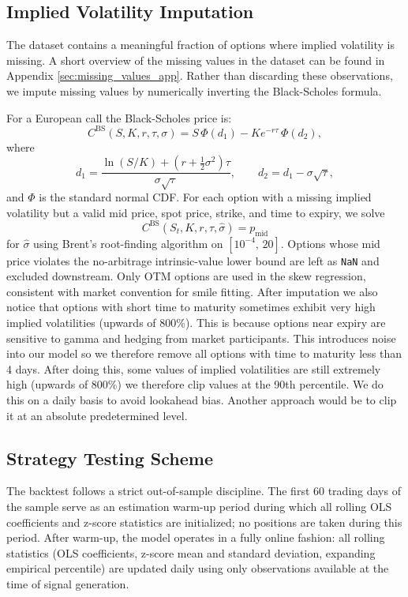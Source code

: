 \documentclass[12pt, a4paper]{article}
\begin{document}
\subsection{Implied Volatility Imputation}
The dataset contains a meaningful fraction of options where implied volatility is missing. A short overview of the missing values in the dataset can be found in Appendix \ref{sec:missing_values_app}. Rather than discarding these observations, we impute missing values by numerically inverting the Black-Scholes formula. 

For a European call the Black-Scholes price is:
\begin{equation}
    C^{\mathrm{BS}}(S, K, r, \tau, \sigma)
    = S\,\Phi(d_1) - K e^{-r\tau}\,\Phi(d_2),
    \label{eq:bs_call}
\end{equation}
where
\[
    d_1 = \frac{\ln(S/K) + (r + \tfrac{1}{2}\sigma^2)\tau}{\sigma\sqrt{\tau}},
    \qquad
    d_2 = d_1 - \sigma\sqrt{\tau},
\]
and $\Phi$ is the standard normal CDF. For each option with a missing implied volatility but a valid mid price, spot price, strike, and time to expiry, we solve
\[
    C^{\mathrm{BS}}(S_t, K, r, \tau, \hat{\sigma}) = p_{\mathrm{mid}}
\]
for $\hat{\sigma}$ using Brent's root-finding algorithm on $[10^{-4},\, 20]$. Options whose mid price violates the no-arbitrage intrinsic-value lower bound are left as \texttt{NaN} and excluded downstream. Only OTM options are used in the skew regression, consistent with market convention for smile fitting. After imputation we also notice that options with short time to maturity sometimes exhibit very high implied volatilities (upwards of 800\%). This is because options near expiry are sensitive to gamma and hedging from market participants. This introduces noise into our model so we therefore remove all options with time to maturity less than 4 days. After doing this, some values of implied volatilities are still extremely high (upwards of 800\%) we therefore clip values at the 90th percentile. We do this on a daily basis to avoid lookahead bias. Another approach would be to clip it at an absolute predetermined level. 

\subsection{Strategy Testing Scheme}
The backtest follows a strict out-of-sample discipline. The first 60 trading days of the sample serve as an estimation warm-up period during which all rolling OLS coefficients and z-score statistics are initialized; no positions are taken during this period. After warm-up, the model operates in a fully online fashion: all rolling statistics (OLS coefficients, z-score mean and standard deviation, expanding empirical percentile) are updated daily using only observations available at the time of signal generation.
\end{document}

